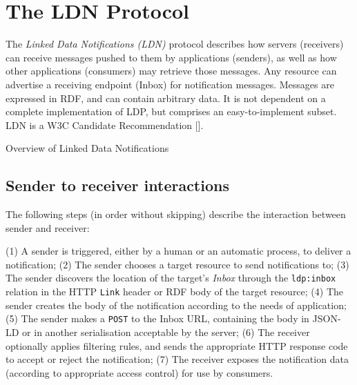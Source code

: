 \documentclass[a4paper]{llncs}
\begin{document}
                    
                        \section{The LDN Protocol}
  \label{protocol}

                        
                            
\par The {\em Linked Data Notifications (LDN)} protocol describes how servers (receivers) can receive messages pushed to them by applications (senders), as well as how other applications (consumers) may retrieve those messages. Any resource can advertise a receiving endpoint (Inbox) for notification messages. Messages are expressed in RDF, and can contain arbitrary data. It is not dependent on a complete implementation of LDP, but comprises an easy-to-implement subset. LDN is a \empty W3C Candidate Recommendation [].

                            
                                

                                Overview of Linked Data Notifications
                            

                            
                                \subsection{Sender to receiver interactions}
  \label{sender-to-receiver}

                                
                                    
\par The following steps (in order without skipping) describe the interaction between sender and receiver:

                                    
\par (1) A sender is triggered, either by a human or an automatic process, to deliver a notification; (2) The sender chooses a target resource to send notifications to; (3) The sender discovers the location of the target’s {\em Inbox} through the {\tt ldp:inbox} relation in the HTTP {\tt Link} header or RDF body of the target resource; (4) The sender creates the body of the notification according to the needs of application; (5) The sender makes a {\tt POST} to the Inbox URL, containing the body in JSON-LD or in another serialisation acceptable by the server; (6) The receiver optionally applies filtering rules, and sends the appropriate HTTP response code to accept or reject the notification; (7) The receiver exposes the notification data (according to appropriate access control) for use by consumers.
                                
\end{document}
